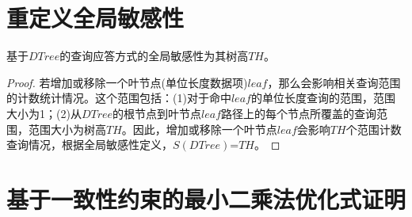 \section{重定义全局敏感性}

\begin{prop}
	基于$DTree$的查询应答方式的全局敏感性为其树高$TH$。
\end{prop}
\begin{proof}
	若增加或移除一个叶节点(单位长度数据项)$leaf$，那么会影响相关查询范围的计数统计情况。这个范围包括：(1)对于命中$leaf$的单位长度查询的范围，范围大小为1；(2)从$DTree$的根节点到叶节点$leaf$路径上的每个节点所覆盖的查询范围，范围大小为树高$TH$。因此，增加或移除一个叶节点$leaf$会影响$TH$个范围计数查询情况，根据全局敏感性定义，$S(DTree)$=$TH$。
\end{proof}

\section{基于一致性约束的最小二乘法优化式证明}

